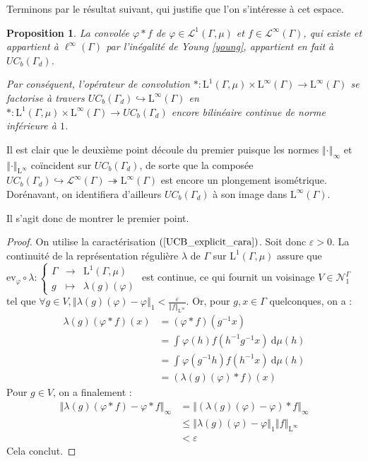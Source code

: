 \documentclass[a4paper,12pt]{article}
\newtheorem{proposition}[theorem]{Proposition}
\newcommand{\ev}{\mathrm{ev}}
\newcommand{\norm}[1]{\left\Vert #1\right\Vert}
\newcommand{\integral}[4]{\int_{#1}^{#2} #3~\mathrm{d}#4}
\newcommand\fundef[3]{#1: \left\{\begin{array}{ccc}#2\\#3\end{array}\right.}
\newcommand{\inv}{^{-1}}
\newcommand{\comp}{\circ}
\newcommand{\nhds}{\mathcal{N}}
\newcommand{\TODO}[1]{}%
\begin{document}
Terminons par le résultat suivant, qui justifie que l'on s'intéresse à cet espace.

\begin{proposition}\label{conv_UCB}
    La convolée $\varphi\ast f$ de $\varphi\in\mathscr{L}^1(\Gamma, \mu)$ et $f\in\mathscr{L}^\infty(\Gamma)$, qui existe et appartient à $\ell^\infty(\Gamma)$ par l'inégalité de Young \ref{young},
    appartient en fait à $UC_b(\Gamma_d)$.

    Par conséquent, l'opérateur de convolution $\ast:\mathrm{L}^1(\Gamma, \mu)\times\mathrm{L}^\infty(\Gamma)\to\mathrm{L}^\infty(\Gamma)$
    se factorise à travers $UC_b(\Gamma_d)\hookrightarrow\mathrm{L}^\infty(\Gamma)$ en 
    $\ast:\mathrm{L}^1(\Gamma, \mu)\times\mathrm{L}^\infty(\Gamma)\to UC_b(\Gamma_d)$ encore bilinéaire continue de norme inférieure à $1$.
\end{proposition}

Il est clair que le deuxième point découle du premier puisque les normes $\norm{\cdot}_\infty$ et $\norm{\cdot}_{\mathrm{L}^\infty}$ coïncident 
sur $UC_b(\Gamma_d)$, de sorte que la composée $UC_b(\Gamma_d)\hookrightarrow\mathscr{L}^\infty(\Gamma)\twoheadrightarrow\mathrm{L}^\infty(\Gamma)$
est encore un plongement isométrique. Dorénavant, on identifiera d'ailleurs $UC_b(\Gamma_d)$ à son image dans $\mathrm{L}^\infty(\Gamma)$.

Il s'agit donc de montrer le premier point.

\begin{proof}
    On utilise la caractérisation $(\ref{UCB_explicit_cara})$. Soit donc $\varepsilon>0$. La continuité de la représentation régulière $\lambda$ de $\Gamma$ sur $\mathrm{L}^1(\Gamma, \mu)$ \TODO{faut-il la remontrer ? Raisonnement par densité}
    assure que 
    $\fundef{\ev_\varphi\comp\lambda}{\Gamma&\to&\mathrm{L}^1(\Gamma, \mu)}{g&\mapsto&\lambda(g)(\varphi)}$ est continue, ce qui fournit 
    un voisinage $V\in\nhds_1^\Gamma$ tel que $\forall g\in V, \norm{\lambda(g)(\varphi) - \varphi}_1<\frac{\varepsilon}{\norm{f}_{\mathrm{L}^\infty}}$. Or, pour $g, x\in \Gamma$ quelconques, on a :
    \begin{align*}
        \lambda(g)(\varphi\ast f)(x)
            &= (\varphi\ast f)(g\inv x) \\
            &= \integral{}{}{\varphi(h)f(h\inv g\inv x)}{\mu(h)} \\
            &= \integral{}{}{\varphi(g\inv h)f(h\inv x)}{\mu(h)} \\
            &= (\lambda(g)(\varphi)\ast f)(x)
    \end{align*}
    Pour $g\in V$, on a finalement :
    \begin{align*}
        \norm{\lambda(g)(\varphi\ast f) - \varphi\ast f}_\infty 
            &= \norm{(\lambda(g)(\varphi) - \varphi)\ast f}_\infty \\
            &\le \norm{\lambda(g)(\varphi) - \varphi}_1\norm{f}_{\mathrm{L}^\infty} \\
            &< \varepsilon
    \end{align*}
    Cela conclut.
\end{proof}
\end{document}
